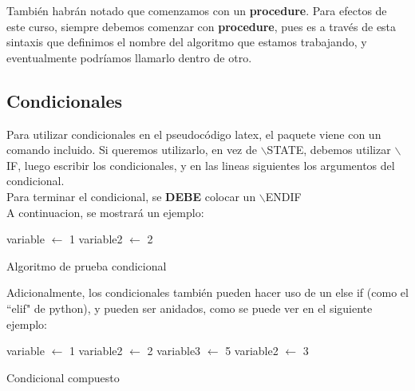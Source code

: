 \documentclass[letterpaper,12pt]{article}
\begin{document}
También habrán notado que comenzamos con un \textbf{procedure}. Para efectos de este curso, siempre debemos comenzar con \textbf{procedure}, pues es a través de esta sintaxis que definimos el nombre del algoritmo que estamos trabajando, y eventualmente podríamos llamarlo dentro de otro.

\subsection{Condicionales}
Para utilizar condicionales en el pseudocódigo latex, el paquete viene con un comando incluido. Si queremos utilizarlo, en vez de $\backslash$STATE, debemos utilizar $\backslash$IF, luego escribir los condicionales, y en las lineas siguientes los argumentos del condicional.\\
Para terminar el condicional, se \textbf{DEBE} colocar un $\backslash$ENDIF\\[0.1cm]
A continuacion, se mostrará un ejemplo:
\begin{algorithm}[H]
  \begin{algorithmic}[1]
        \STATE variable $\leftarrow$ 1
        \STATE variable2 $\leftarrow$ 2
        \ENDIF
  \end{algorithmic}
  \caption{Algoritmo de prueba condicional}
  \label{alg:testing2}
\end{algorithm}
Adicionalmente, los condicionales también pueden hacer uso de un else if (como el ``elif" de python), y pueden ser anidados, como se puede ver en el siguiente ejemplo:
\begin{algorithm}[H]
\begin{algorithmic}[1]
        \STATE variable $\leftarrow$ 1
        \STATE variable2 $\leftarrow$ 2
        \STATE variable3 $\leftarrow$ 5
        \ENDIF
        \STATE variable2 $\leftarrow$ 3
        \ENDIF
  \end{algorithmic}
  \caption{Condicional compuesto}
  \label{alg:testing3}
\end{algorithm}
\end{document}
